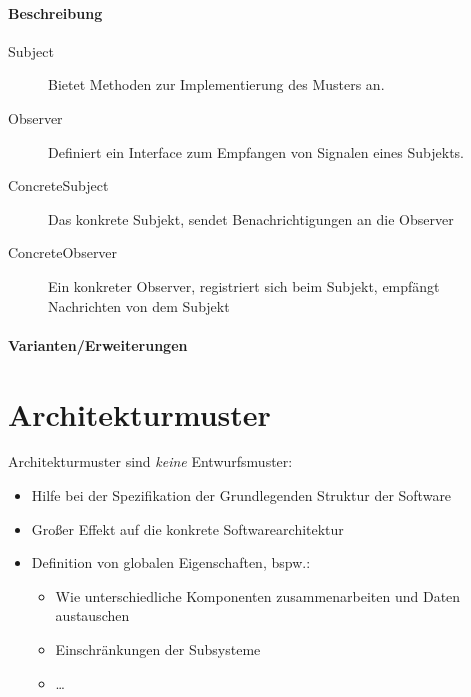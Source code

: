 			\paragraph{Beschreibung}
				\begin{description}
					\item[Subject] Bietet Methoden zur Implementierung des Musters an.
					\item[Observer] Definiert ein Interface zum Empfangen von Signalen eines Subjekts.
					\item[ConcreteSubject] Das konkrete Subjekt, sendet Benachrichtigungen an die Observer
					\item[ConcreteObserver] Ein konkreter Observer, registriert sich beim Subjekt, empfängt Nachrichten von dem Subjekt
				\end{description}
			
			\paragraph{Varianten/Erweiterungen}
	
	\section{Architekturmuster}
		Architekturmuster sind \textit{keine} Entwurfsmuster:
		\begin{itemize}
			\item Hilfe bei der Spezifikation der Grundlegenden Struktur der Software
			\item Großer Effekt auf die konkrete Softwarearchitektur
			\item Definition von globalen Eigenschaften, bspw.:
				\begin{itemize}
					\item Wie unterschiedliche Komponenten zusammenarbeiten und Daten austauschen
					\item Einschränkungen der Subsysteme
					\item \dots
				\end{itemize}
		\end{itemize}

